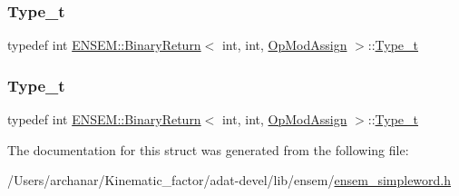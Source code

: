 \mbox{\label{structENSEM_1_1BinaryReturn_3_01int_00_01int_00_01OpModAssign_01_4_a3b37439e87d2e89d2bf9f5b7738f2a61}} 
\subsubsection{\texorpdfstring{Type\_t}{Type\_t}\hspace{0.1cm}{\footnotesize\ttfamily [2/3]}}
{\footnotesize\ttfamily typedef int \mbox{\hyperlink{structENSEM_1_1BinaryReturn}{E\+N\+S\+E\+M\+::\+Binary\+Return}}$<$ int, int, \mbox{\hyperlink{structENSEM_1_1OpModAssign}{Op\+Mod\+Assign}} $>$\+::\mbox{\hyperlink{structENSEM_1_1BinaryReturn_3_01int_00_01int_00_01OpModAssign_01_4_a3b37439e87d2e89d2bf9f5b7738f2a61}{Type\+\_\+t}}}

\mbox{\label{structENSEM_1_1BinaryReturn_3_01int_00_01int_00_01OpModAssign_01_4_a3b37439e87d2e89d2bf9f5b7738f2a61}} 
\subsubsection{\texorpdfstring{Type\_t}{Type\_t}\hspace{0.1cm}{\footnotesize\ttfamily [3/3]}}
{\footnotesize\ttfamily typedef int \mbox{\hyperlink{structENSEM_1_1BinaryReturn}{E\+N\+S\+E\+M\+::\+Binary\+Return}}$<$ int, int, \mbox{\hyperlink{structENSEM_1_1OpModAssign}{Op\+Mod\+Assign}} $>$\+::\mbox{\hyperlink{structENSEM_1_1BinaryReturn_3_01int_00_01int_00_01OpModAssign_01_4_a3b37439e87d2e89d2bf9f5b7738f2a61}{Type\+\_\+t}}}



The documentation for this struct was generated from the following file\+:\begin{DoxyCompactItemize}
\item 
/\+Users/archanar/\+Kinematic\+\_\+factor/adat-\/devel/lib/ensem/\mbox{\hyperlink{adat-devel_2lib_2ensem_2ensem__simpleword_8h}{ensem\+\_\+simpleword.\+h}}\end{DoxyCompactItemize}
